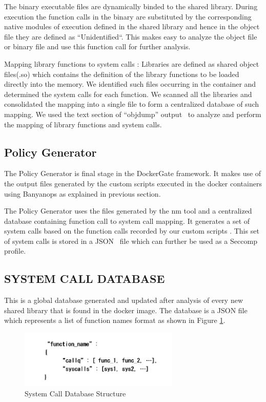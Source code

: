 The binary executable files are dynamically binded to the shared library. During execution the function calls in the binary are substituted by the corresponding native modules of execution defined in the shared library and hence in the object file they are  defined as ``Unidentified``. This makes easy to analyze the object file or binary file and use this function call for further analysis.

Mapping library functions to system calls : Libraries are defined as shared object files(.so) which contains the definition of the library functions to be loaded directly into the memory. We identified such files occurring in the container and determined the system calls for each function. We scanned all the libraries and consolidated the mapping into a single file to form a centralized database of such mapping. We used the  text section of “objdump” output~\cite{objdump} to analyze and perform the mapping of library functions and system calls. 

\subsection{Policy Generator}  

The Policy Generator is final stage in the DockerGate framework. It makes use of the output files generated by the custom scripts executed in the docker containers using Banyanops as explained in previous section.

The Policy Generator uses the files generated by the nm tool and a centralized database containing function call to system call mapping. It generates a set of system calls based on the function calls recorded by our custom scripts . This set of system calls is stored in a JSON~\cite{json} file which can further be used as a Seccomp profile.

\subsection{SYSTEM CALL DATABASE}
This is a global database generated and updated after analysis of every new shared library that is found in the docker image. The database is a JSON file which represents a list of function names format as shown in Figure \ref{fig:syscall_db}. 

\begin{figure}[t]
  \centering
  \includegraphics[width=3in]{figs/syscalldb}
  \caption{System Call Database Structure}
  \label{fig:syscall_db}
\end{figure}

